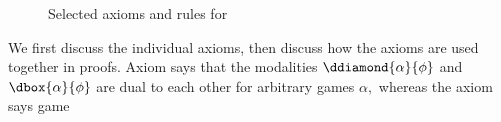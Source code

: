 \documentclass[12pt]{cmuthesis}
\theoremstyle{definition}
\theoremstyle{remark}
\begin{document}
\begin{figure}
  \centering
  \begin{calculuscollections}{\columnwidth}
    \begin{calculus}
\cinferenceRule[dglbox|{$[\cdot]$}]{}
{
\linferenceRule[equiv]{\dbox{\alpha}{\phi}}{\neg\ddiamond{\alpha}{\neg\phi}}
}{}
\cinferenceRule[dglassign|{$\langle:=\rangle$}]{}
{
}{}
{
}{}
{
}{}
{
\linferenceRule[equiv]{(\phi \land \psi)}{\ddiamond{\ptest{\psi}}{\phi}}
}{}
{
\linferenceRule[equiv]{\ddiamond{\alpha}{\phi} \lor \ddiamond{\beta}{\phi}}{\ddiamond{\alpha \cup \beta}{\phi}}
}{}
{
\linferenceRule[equiv]{\ddiamond{\alpha}{\ddiamond{\beta}{\phi}}}{\ddiamond{\alpha;\beta}{\phi}}
}{}
{
\linferenceRule[impl]{\phi\lor\ddiamond{\alpha}{\ddiamond{\prepeat{\alpha}}{\phi}}}{\ddiamond{\prepeat{\alpha}}{\phi}}
}{}
{
\linferenceRule[equiv]{\ddiamond{\pdual{\alpha}}{\phi}}{\neg\ddiamond{\alpha}{\neg\phi}}
}{}
\cinferenceRule[dglMon|M]{}
{
\linferenceRule[formula]{\phi\limply\psi}{\ddiamond{\alpha}{\phi}\limply\ddiamond{\alpha}{\psi}}
}{}
\cinferenceRule[dglfixpoint|FP]{}
{
\linferenceRule[formula]{\phi\lor\ddiamond{\alpha}{\psi} \limply \psi}{\ddiamond{\prepeat{\alpha}}{\phi} \to \psi}
}{}
    \end{calculus}
  \end{calculuscollections}
  \caption{Selected axioms and rules for \dGL}
  \label{fig:dgl-axioms}
\end{figure}
We first discuss the individual axioms, then discuss how the axioms are used together in proofs.
Axiom  says that the modalities $\ddiamond{\alpha}{\phi}$ and $\dbox{\alpha}{\phi}$ are dual to each other for arbitrary games $\alpha,$ whereas the axiom  says game 
\end{document}
